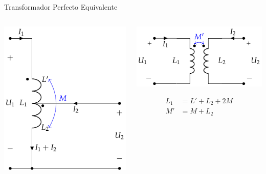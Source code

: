 \documentclass[aspectratio=169, usenames,svgnames,dvipsnames]{beamer}
\begin{document}
\begin{frame}[label={sec:org63211da}]{Transformador Perfecto Equivalente}
\begin{columns}
\begin{column}{0.5\columnwidth}
\begin{center}
\includegraphics[height=0.6\textheight]{../figs/AutotrafoPerfecto.pdf}
\end{center}
\end{column}
\begin{column}{0.5\columnwidth}
\begin{center}
\includegraphics[height=0.4\textheight]{../figs/AutoTrafo_TrafoPerfecto.pdf}
\end{center}

\begin{align*}
  L_1 &= L' + L_2 + 2M\\
  M' &= M + L_2
\end{align*}
\end{column}
\end{columns}
\end{frame}
\end{document}
